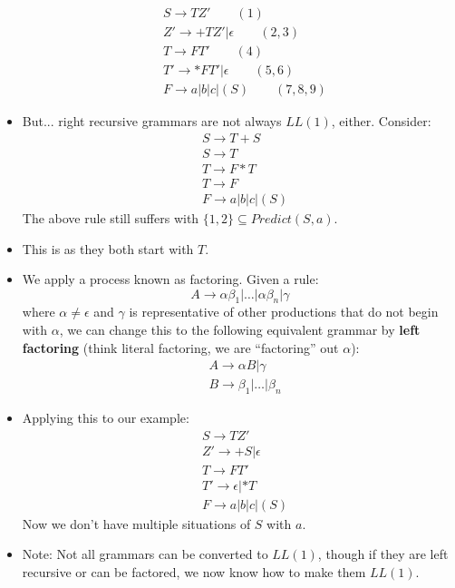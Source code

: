 \documentclass[12pt]{article}
\begin{document}
\begin{itemize}
\begin{align*}
            &S \rightarrow TZ' \qquad (1)\\
            &Z' \rightarrow +TZ' | \epsilon \qquad (2, 3)\\
            &T \rightarrow FT' \qquad (4)\\
            &T' \rightarrow *FT' | \epsilon \qquad (5, 6) \\
            &F \rightarrow a | b | c | (S) \qquad (7, 8, 9)
        \end{align*}
    \item But... right recursive grammars are not always $LL(1)$, either.  Consider:
        \begin{align}
            &S \rightarrow T + S \\
            &S \rightarrow T \\
            &T \rightarrow F * T \\
            &T \rightarrow F \\
            &F \rightarrow a | b | c | (S)
        \end{align}
        The above rule still suffers with $\{1, 2\} \subseteq Predict(S, a)$.  
    \item This is as they both start with $T$.  
    \item We apply a process known as factoring.  Given a rule:
        $$A \rightarrow \alpha \beta_1 | \dots | \alpha \beta_n | \gamma $$
        where $\alpha \not= \epsilon$ and $\gamma$ is representative of other productions that do not begin with $\alpha$, we can change this to the following equivalent grammar by \textbf{left factoring} (think literal factoring, we are ``factoring'' out $\alpha$):
        \begin{align*}
            &A \rightarrow \alpha B |\gamma \\
            &B \rightarrow \beta_1 | \dots | \beta_n
        \end{align*}
    \item Applying this to our example:
        \begin{align}
            &S \rightarrow TZ' \\
            &Z' \rightarrow +S | \epsilon\\
            &T \rightarrow FT' \\
            &T' \rightarrow \epsilon | *T \\
            &F  \rightarrow a | b | c | (S)
        \end{align}
        Now we don't have multiple situations of $S$ with $a$.
    \item Note:  Not all grammars can be converted to $LL(1)$, though if they are left recursive or can be factored, we now know how to make them $LL(1)$.
\end{itemize}
\end{document}
